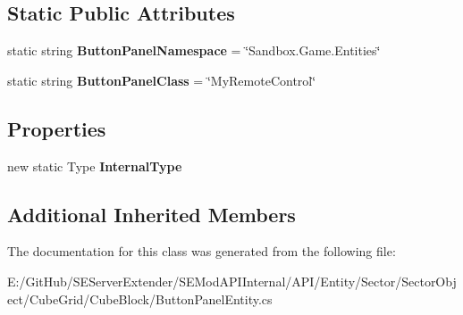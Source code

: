 \subsection*{Static Public Attributes}
\begin{DoxyCompactItemize}
\item 
\hypertarget{class_s_e_mod_a_p_i_internal_1_1_a_p_i_1_1_entity_1_1_sector_1_1_sector_object_1_1_cube_grid_1_182a07a9a51cd4f2f7a7f493193da48cf_a27fb460665f51bd1ea00f8e2d825e4c8}{}static string {\bfseries Button\+Panel\+Namespace} = \char`\"{}Sandbox.\+Game.\+Entities\char`\"{}\label{class_s_e_mod_a_p_i_internal_1_1_a_p_i_1_1_entity_1_1_sector_1_1_sector_object_1_1_cube_grid_1_182a07a9a51cd4f2f7a7f493193da48cf_a27fb460665f51bd1ea00f8e2d825e4c8}

\item 
\hypertarget{class_s_e_mod_a_p_i_internal_1_1_a_p_i_1_1_entity_1_1_sector_1_1_sector_object_1_1_cube_grid_1_182a07a9a51cd4f2f7a7f493193da48cf_adb0c2619ca06ac5b6063ba6cd49d8257}{}static string {\bfseries Button\+Panel\+Class} = \char`\"{}My\+Remote\+Control\char`\"{}\label{class_s_e_mod_a_p_i_internal_1_1_a_p_i_1_1_entity_1_1_sector_1_1_sector_object_1_1_cube_grid_1_182a07a9a51cd4f2f7a7f493193da48cf_adb0c2619ca06ac5b6063ba6cd49d8257}

\end{DoxyCompactItemize}
\subsection*{Properties}
\begin{DoxyCompactItemize}
\item 
\hypertarget{class_s_e_mod_a_p_i_internal_1_1_a_p_i_1_1_entity_1_1_sector_1_1_sector_object_1_1_cube_grid_1_182a07a9a51cd4f2f7a7f493193da48cf_a993c67fa94aab12341d823dc40d01b0e}{}new static Type {\bfseries Internal\+Type}\label{class_s_e_mod_a_p_i_internal_1_1_a_p_i_1_1_entity_1_1_sector_1_1_sector_object_1_1_cube_grid_1_182a07a9a51cd4f2f7a7f493193da48cf_a993c67fa94aab12341d823dc40d01b0e}

\end{DoxyCompactItemize}
\subsection*{Additional Inherited Members}


The documentation for this class was generated from the following file\+:\begin{DoxyCompactItemize}
\item 
E\+:/\+Git\+Hub/\+S\+E\+Server\+Extender/\+S\+E\+Mod\+A\+P\+I\+Internal/\+A\+P\+I/\+Entity/\+Sector/\+Sector\+Object/\+Cube\+Grid/\+Cube\+Block/Button\+Panel\+Entity.\+cs\end{DoxyCompactItemize}

